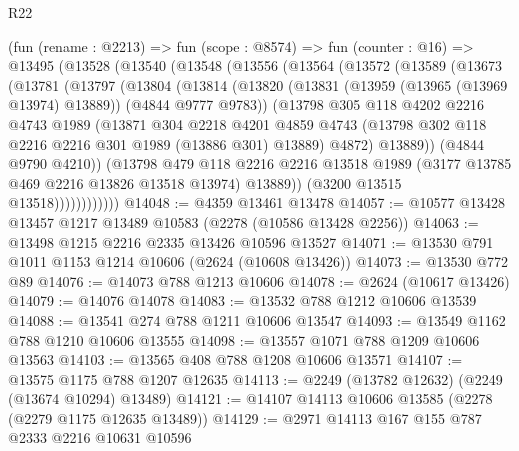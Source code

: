 \begin{lexlean}{R22}
\begin{coremodule}
    (fun (rename : @2213) =>
    fun (scope : @8574) =>
    fun (counter : @16) =>
    @13495
      (@13528
        (@13540
          (@13548
            (@13556
              (@13564
                (@13572
                  (@13589
                    (@13673
                      (@13781
                        (@13797
                          (@13804
                            (@13814
                              (@13820
                                (@13831
                                  (@13959 (@13965 (@13969 @13974) @13889))
                                  (@4844 @9777 @9783))
                                (@13798
                                  @305
                                  @118
                                  @4202
                                  @2216
                                  @4743
                                  @1989
                                  (@13871
                                    @304
                                    @2218
                                    @4201
                                    @4859
                                    @4743
                                    (@13798 @302 @118 @2216 @2216 @301 @1989 (@13886 @301) @13889)
                                    @4872)
                                  @13889))
                              (@4844 @9790 @4210))
                            (@13798
                              @479
                              @118
                              @2216
                              @2216
                              @13518
                              @1989
                              (@3177 @13785 @469 @2216 @13826 @13518 @13974)
                              @13889))
                          (@3200 @13515 @13518))))))))))))
@14048 := @4359 @13461 @13478
@14057 := @10577 @13428 @13457 @1217 @13489 @10583 (@2278 (@10586 @13428 @2256))
@14063 := @13498 @1215 @2216 @2335 @13426 @10596 @13527
@14071 := @13530 @791 @1011 @1153 @1214 @10606 (@2624 (@10608 @13426))
@14073 := @13530 @772 @89
@14076 := @14073 @788 @1213 @10606
@14078 := @2624 (@10617 @13426)
@14079 := @14076 @14078
@14083 := @13532 @788 @1212 @10606 @13539
@14088 := @13541 @274 @788 @1211 @10606 @13547
@14093 := @13549 @1162 @788 @1210 @10606 @13555
@14098 := @13557 @1071 @788 @1209 @10606 @13563
@14103 := @13565 @408 @788 @1208 @10606 @13571
@14107 := @13575 @1175 @788 @1207 @12635
@14113 := @2249 (@13782 @12632) (@2249 (@13674 @10294) @13489)
@14121 := @14107 @14113 @10606 @13585 (@2278 (@2279 @1175 @12635 @13489))
@14129 := @2971 @14113 @167 @155 @787 @2333 @2216 @10631 @10596

\end{coremodule}
\end{lexlean}
